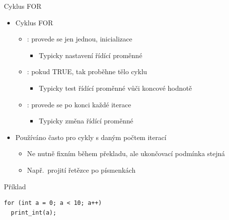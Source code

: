 \begin{frame}[fragile]{Cyklus FOR}

  \begin{itemize}
    \item Cyklus FOR
    \begin{itemize}
      \item {}: provede se jen jednou, inicializace
      \begin{itemize}
	\item Typicky nastavení řídící proměnné
      \end{itemize}

      \pause

      \item {}: pokud TRUE, tak proběhne tělo cyklu
      \begin{itemize}
	\item Typicky test řídící proměnné vůči koncové hodnotě
      \end{itemize}

      \pause

      \item {}: provede se po konci každé iterace
      \begin{itemize}
	\item Typicky změna řídící proměnné
      \end{itemize}
    \end{itemize}

    \pause

    \item Používáno často pro cykly s daným počtem iterací
    \begin{itemize}
      \item Ne nutně fixním během překladu, ale ukončovací podmínka stejná
      \item Např.\ projití řetězce po písmenkách
    \end{itemize}

  \end{itemize}


  \begin{block}{Příklad}
  \begin{lstlisting}
for (int a = 0; a < 10; a++)
  print_int(a);
  \end{lstlisting} %
  \end{block}

\end{frame}

